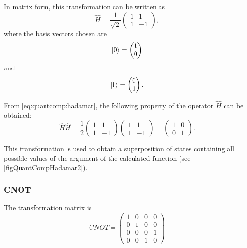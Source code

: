 In matrix form, this transformation can be written as
\begin{equation}
\hat{H} = \frac{1}{\sqrt{2}}
\begin{pmatrix}
1 & 1 \\
1 & -1
\end{pmatrix},
\label{eq:quantcomp:hadamar}
\end{equation}
where the basis vectors chosen are
\[
\ket{0} = \begin{pmatrix}
1 \\ 0 
\end{pmatrix}
\]
and
\[
\ket{1} = \begin{pmatrix}
0 \\ 1 
\end{pmatrix}.
\]



From \eqref{eq:quantcomp:hadamar}, the following property of the operator $\hat{H}$ can be obtained:
\begin{equation}
\hat{H} \hat{H} = \frac{1}{2}
\begin{pmatrix}
1 & 1 \\
1 & -1
\end{pmatrix}
\begin{pmatrix}
1 & 1 \\
1 & -1
\end{pmatrix} = 
\begin{pmatrix}
1 & 0 \\
0 & 1
\end{pmatrix}.
\label{eq:quantcomp:hadamar_prop}
\end{equation}

This transformation is used to obtain a superposition of states containing all possible values of the argument of the calculated function (see \autoref{figQuantCompHadamar2}).



\subsubsection{CNOT}

The transformation matrix is
\[
CNOT=\begin{pmatrix}
1 & 0 & 0 & 0 \\
0 & 1 & 0 & 0 \\
0 & 0 & 0 & 1 \\
0 & 0 & 1 & 0 
\end{pmatrix}
\]

